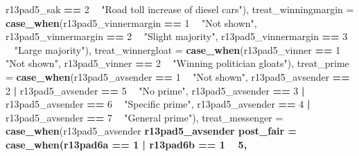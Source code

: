 \documentclass[]{book}
\newenvironment{Shaded}{\begin{snugshade}}{\end{snugshade}}
\newcommand{\KeywordTok}[1]{\textcolor[rgb]{0.13,0.29,0.53}{\textbf{#1}}}
\newcommand{\DataTypeTok}[1]{\textcolor[rgb]{0.13,0.29,0.53}{#1}}
\newcommand{\DecValTok}[1]{\textcolor[rgb]{0.00,0.00,0.81}{#1}}
\newcommand{\StringTok}[1]{\textcolor[rgb]{0.31,0.60,0.02}{#1}}
\newcommand{\OperatorTok}[1]{\textcolor[rgb]{0.81,0.36,0.00}{\textbf{#1}}}
\newcommand{\NormalTok}[1]{#1}
\begin{document}
\begin{Shaded}
\begin{Highlighting}[]
{{{{{\NormalTok{                               r13pad5_sak }\OperatorTok{==}\StringTok{ }\DecValTok{2} \OperatorTok{~}\StringTok{ "Road toll increase of diesel cars"}\NormalTok{),}
         \DataTypeTok{treat_winningmargin =} \KeywordTok{case_when}\NormalTok{(r13pad5_vinnermargin }\OperatorTok{==}\StringTok{ }\DecValTok{1} \OperatorTok{~}\StringTok{ "Not shown"}\NormalTok{,}
\NormalTok{                                       r13pad5_vinnermargin }\OperatorTok{==}\StringTok{ }\DecValTok{2} \OperatorTok{~}\StringTok{ "Slight majority"}\NormalTok{,}
\NormalTok{                                       r13pad5_vinnermargin }\OperatorTok{==}\StringTok{ }\DecValTok{3} \OperatorTok{~}\StringTok{ "Large majority"}\NormalTok{),}
         \DataTypeTok{treat_winnergloat =} \KeywordTok{case_when}\NormalTok{(r13pad5_vinner }\OperatorTok{==}\StringTok{ }\DecValTok{1} \OperatorTok{~}\StringTok{ "Not shown"}\NormalTok{,}
\NormalTok{                                     r13pad5_vinner }\OperatorTok{==}\StringTok{ }\DecValTok{2} \OperatorTok{~}\StringTok{ "Winning politician gloats"}\NormalTok{),}
         \DataTypeTok{treat_prime =} \KeywordTok{case_when}\NormalTok{(r13pad5_avsender }\OperatorTok{==}\StringTok{ }\DecValTok{1} \OperatorTok{~}\StringTok{ "Not shown"}\NormalTok{,}
\NormalTok{                               r13pad5_avsender }\OperatorTok{==}\StringTok{ }\DecValTok{2}  \OperatorTok{|}\StringTok{ }\NormalTok{r13pad5_avsender }\OperatorTok{==}\StringTok{ }\DecValTok{5} \OperatorTok{~}\StringTok{ "No prime"}\NormalTok{,}
\NormalTok{                               r13pad5_avsender }\OperatorTok{==}\StringTok{ }\DecValTok{3}  \OperatorTok{|}\StringTok{ }\NormalTok{r13pad5_avsender }\OperatorTok{==}\StringTok{ }\DecValTok{6} \OperatorTok{~}\StringTok{ "Specific prime"}\NormalTok{,}
\NormalTok{                               r13pad5_avsender }\OperatorTok{==}\StringTok{ }\DecValTok{4} \OperatorTok{|}\StringTok{ }\NormalTok{r13pad5_avsender }\OperatorTok{==}\StringTok{ }\DecValTok{7} \OperatorTok{~}\StringTok{ "General prime"}\NormalTok{),}
       \DataTypeTok{treat_messenger =} \KeywordTok{case_when}\NormalTok{(r13pad5_avsender }\OperatorTok{%in%}\StringTok{ }\DecValTok{3}\OperatorTok{:}\DecValTok{4} \OperatorTok{~}\StringTok{ "Political leader"}\NormalTok{,}
\NormalTok{                                   r13pad5_avsender }\OperatorTok{%in%}\StringTok{ }\DecValTok{6}\OperatorTok{:}\DecValTok{7} \OperatorTok{~}\StringTok{ "Local newspaper"}\NormalTok{),}
                \DataTypeTok{post_fair =} \KeywordTok{case_when}\NormalTok{(r13pad6a }\OperatorTok{==}\StringTok{ }\DecValTok{1} \OperatorTok{|}\StringTok{ }\NormalTok{r13pad6b }\OperatorTok{==}\StringTok{ }\DecValTok{1} \OperatorTok{~}\StringTok{ }\DecValTok{5}\NormalTok{,}
}}}}}}}
\end{Highlighting}
\end{Shaded}
\end{document}
